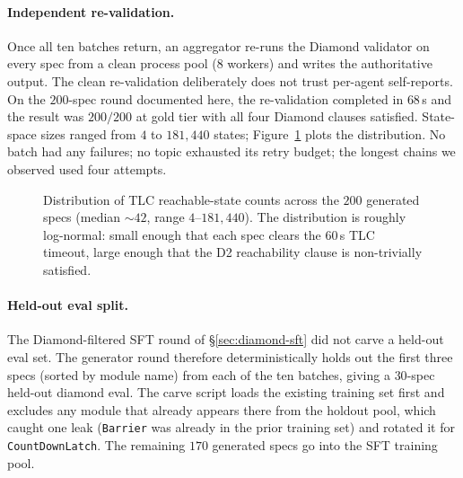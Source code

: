 \documentclass[11pt]{article}
\begin{document}
\paragraph{Independent re-validation.} Once all ten batches return, an
aggregator re-runs the Diamond validator on every spec from a clean
process pool ($8$ workers) and writes the authoritative output. The
clean re-validation deliberately does not trust per-agent self-reports.
On the $200$-spec round documented here, the re-validation completed in
$68$\,s and the result was $200/200$ at gold tier with all four Diamond
clauses satisfied. State-space sizes ranged from $4$ to $181{,}440$
states; Figure~\ref{fig:state-space} plots the distribution. No batch
had any failures; no topic exhausted its retry budget; the longest
chains we observed used four attempts.

\begin{figure}[t]
\centering
{}
\caption{Distribution of TLC reachable-state counts across the $200$
generated specs (median $\sim\!42$, range $4$--$181{,}440$). The
distribution is roughly log-normal: small enough that each spec clears
the $60$\,s TLC timeout, large enough that the D2 reachability clause
is non-trivially satisfied.}
\label{fig:state-space}
\end{figure}

\paragraph{Held-out eval split.} The Diamond-filtered SFT round of
\S\ref{sec:diamond-sft} did not carve a held-out eval set. The
generator round therefore deterministically holds out the first three
specs (sorted by module name) from each of the ten batches, giving a
$30$-spec held-out diamond eval. The carve script loads the existing
training set first and excludes any module that already appears there
from the holdout pool, which caught one leak (\texttt{Barrier} was
already in the prior training set) and rotated it for
\texttt{CountDownLatch}. The remaining $170$ generated specs go into the
SFT training pool.
\end{document}
